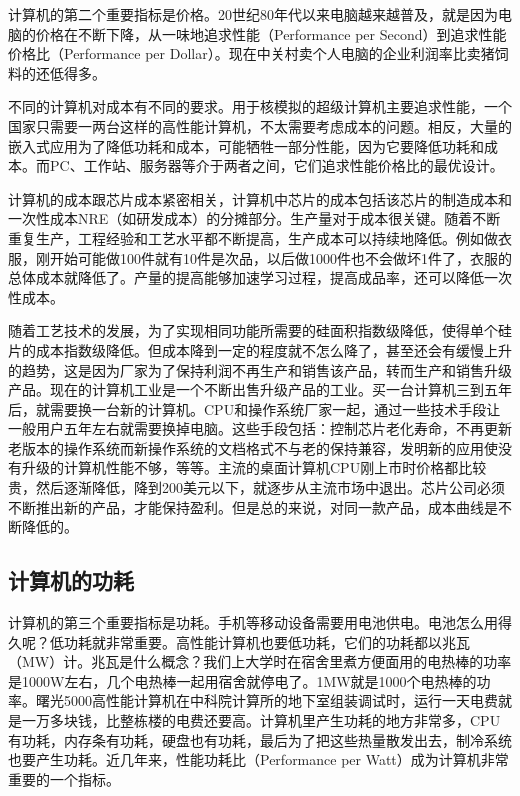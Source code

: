\documentclass[]{ctexbook}
\begin{document}
计算机的第二个重要指标是价格。20世纪80年代以来电脑越来越普及，就是因为电脑的价格在不断下降，从一味地追求性能（Performance per Second）到追求性能价格比（Performance per Dollar）。现在中关村卖个人电脑的企业利润率比卖猪饲料的还低得多。

不同的计算机对成本有不同的要求。用于核模拟的超级计算机主要追求性能，一个国家只需要一两台这样的高性能计算机，不太需要考虑成本的问题。相反，大量的嵌入式应用为了降低功耗和成本，可能牺牲一部分性能，因为它要降低功耗和成本。而PC、工作站、服务器等介于两者之间，它们追求性能价格比的最优设计。

计算机的成本跟芯片成本紧密相关，计算机中芯片的成本包括该芯片的制造成本和一次性成本NRE（如研发成本）的分摊部分。生产量对于成本很关键。随着不断重复生产，工程经验和工艺水平都不断提高，生产成本可以持续地降低。例如做衣服，刚开始可能做100件就有10件是次品，以后做1000件也不会做坏1件了，衣服的总体成本就降低了。产量的提高能够加速学习过程，提高成品率，还可以降低一次性成本。

随着工艺技术的发展，为了实现相同功能所需要的硅面积指数级降低，使得单个硅片的成本指数级降低。但成本降到一定的程度就不怎么降了，甚至还会有缓慢上升的趋势，这是因为厂家为了保持利润不再生产和销售该产品，转而生产和销售升级产品。现在的计算机工业是一个不断出售升级产品的工业。买一台计算机三到五年后，就需要换一台新的计算机。CPU和操作系统厂家一起，通过一些技术手段让一般用户五年左右就需要换掉电脑。这些手段包括：控制芯片老化寿命，不再更新老版本的操作系统而新操作系统的文档格式不与老的保持兼容，发明新的应用使没有升级的计算机性能不够，等等。主流的桌面计算机CPU刚上市时价格都比较贵，然后逐渐降低，降到200美元以下，就逐步从主流市场中退出。芯片公司必须不断推出新的产品，才能保持盈利。但是总的来说，对同一款产品，成本曲线是不断降低的。

\hypertarget{ux8ba1ux7b97ux673aux7684ux529fux8017}{%
\subsection{计算机的功耗}\label{ux8ba1ux7b97ux673aux7684ux529fux8017}}

计算机的第三个重要指标是功耗。手机等移动设备需要用电池供电。电池怎么用得久呢？低功耗就非常重要。高性能计算机也要低功耗，它们的功耗都以兆瓦（MW）计。兆瓦是什么概念？我们上大学时在宿舍里煮方便面用的电热棒的功率是1000W左右，几个电热棒一起用宿舍就停电了。1MW就是1000个电热棒的功率。曙光5000高性能计算机在中科院计算所的地下室组装调试时，运行一天电费就是一万多块钱，比整栋楼的电费还要高。计算机里产生功耗的地方非常多，CPU有功耗，内存条有功耗，硬盘也有功耗，最后为了把这些热量散发出去，制冷系统也要产生功耗。近几年来，性能功耗比（Performance per Watt）成为计算机非常重要的一个指标。
\end{document}
